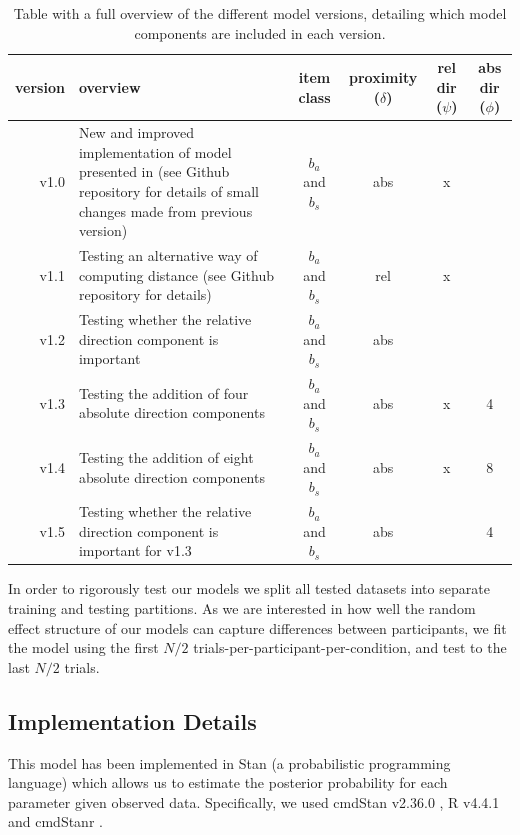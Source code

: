 \documentclass[man, floatsintext]{apa7}
\begin{document}
\begin{table}[bp]
\centering
\begin{tabular}{r|p{5cm}|c|c|c|c}
version & overview & item class  & proximity ($\delta$) & rel dir ($\psi$) & abs dir ($\phi$) \\
 \hline
 v1.0  & New and improved implementation of model presented in \cite{clarke2022foraging} (see Github repository for details of small changes made from previous version) & $b_a$ and $b_s$ & abs & x &  \\
 \hline
 v1.1 & Testing an alternative way of computing distance (see Github repository for details) & $b_a$ and $b_s$ & rel & x & \\
 \hline
 v1.2 & Testing whether the relative direction component is important & $b_a$ and $b_s$ & abs & & \\
 \hline
 v1.3 & Testing the addition of four absolute direction components & $b_a$ and $b_s$ & abs & x & 4 \\
 \hline
 v1.4 & Testing the addition of eight absolute direction components & $b_a$ and $b_s$ & abs & x & 8 \\
 \hline
 v1.5 & Testing whether the relative direction component is important for v1.3 & $b_a$ and $b_s$ & abs &  & 4 \\

\end{tabular}
\caption{Table with a full overview of the different model versions, detailing which model components are included in each version.} 
\label{tab:model_vers}
\end{table}

In order to rigorously test our models we split all tested datasets into separate training and testing partitions. As we are interested in how well the random effect structure of our models can capture differences between participants, we fit the model using the first $N/2$ trials-per-participant-per-condition, and test to the last $N/2$ trials.


\subsection{Implementation Details}

This model has been implemented in Stan (a probabilistic programming language) which allows us to estimate the posterior probability for each parameter given observed data. Specifically, we used cmdStan v2.36.0 \citep{stan2025}, R v4.4.1 \citep{r} and cmdStanr \citep{cmdstanr}.
\end{document}
